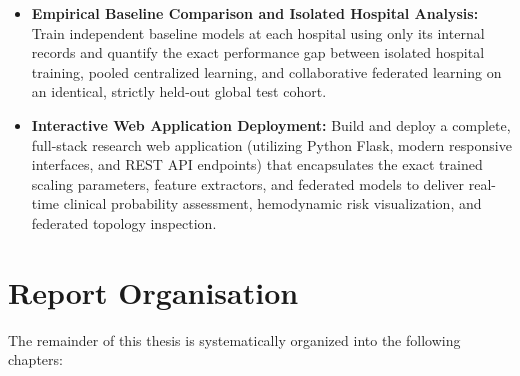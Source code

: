 \documentclass[12pt,a4paper,oneside]{report}
\begin{document}
\begin{itemize}
    \item \textbf{Empirical Baseline Comparison and Isolated Hospital Analysis:} Train independent baseline models at each hospital using only its internal records and quantify the exact performance gap between isolated hospital training, pooled centralized learning, and collaborative federated learning on an identical, strictly held-out global test cohort.
    
    \item \textbf{Interactive Web Application Deployment:} Build and deploy a complete, full-stack research web application (utilizing Python Flask, modern responsive interfaces, and REST API endpoints) that encapsulates the exact trained scaling parameters, feature extractors, and federated models to deliver real-time clinical probability assessment, hemodynamic risk visualization, and federated topology inspection.
\end{itemize}

\section{Report Organisation}
\label{sec:report_organisation}

The remainder of this thesis is systematically organized into the following chapters:
\end{document}
